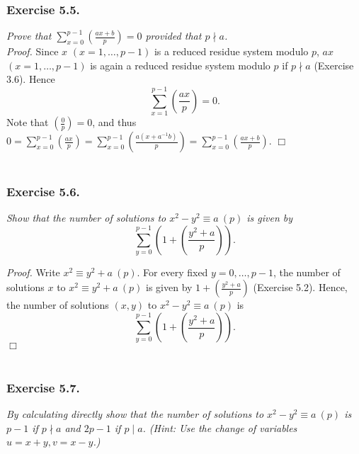\documentclass{article}
\begin{document}
\subsubsection*{Exercise 5.5.}
\emph{Prove that $\sum_{x=0}^{p-1} \left( \frac{ax+b}{p} \right) = 0$
provided that $p \nmid a$.} \\

\emph{Proof.}
Since $x$ $(x = 1, \ldots, p-1)$ is a reduced residue system modulo $p$,
$ax$ $(x = 1, \ldots, p-1)$ is again a reduced residue system modulo $p$ if $p \nmid a$
(Exercise 3.6).
Hence
$$\sum_{x=1}^{p-1} \left( \frac{ax}{p} \right) = 0.$$
Note that $\left( \frac{0}{p} \right) = 0$,
and thus
$0
= \sum_{x=0}^{p-1} \left( \frac{ax}{p} \right)
= \sum_{x=0}^{p-1} \left( \frac{a(x+a^{-1}b)}{p} \right)
= \sum_{x=0}^{p-1} \left( \frac{ax+b}{p} \right)$.
$\Box$ \\\\






\subsubsection*{Exercise 5.6.}
\emph{Show that the number of solutions to $x^2 - y^2 \equiv a \: (p)$
is given by
$$\sum_{y=0}^{p-1} \left( 1 + \left( \frac{y^2 + a}{p} \right) \right).$$ }

\emph{Proof.}
Write $x^2 \equiv y^2 + a \: (p)$.
For every fixed $y = 0, \ldots, p-1$,
the number of solutions $x$ to $x^2 \equiv y^2 + a \: (p)$
is given by $1 + \left( \frac{y^2 + a}{p} \right)$ (Exercise 5.2).
Hence, the number of solutions $(x, y)$ to $x^2 - y^2 \equiv a \: (p)$
is
$$\sum_{y=0}^{p-1} \left( 1 + \left( \frac{y^2 + a}{p} \right) \right).$$
$\Box$ \\\\






\subsubsection*{Exercise 5.7.}
\emph{By calculating directly show that
the number of solutions to $x^2 - y^2 \equiv a \: (p)$
is $p-1$ if $p \nmid a$ and $2p-1$ if $p \mid a$.
(Hint: Use the change of variables $u=x+y, v=x-y$.) } \\
\end{document}

